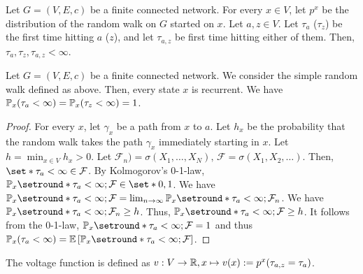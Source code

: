 \begin{lem}
  Let $G=(V,E,c)$ be a finite connected network. For every $x\in V$, let \(p^x\) be the distribution of the random walk on $G$ started on $x$. Let $a,z \in V$. Let $\tau_a$ ($\tau_z$) be the first time hitting $a$ ($z$), and let $\tau_{a,z}$ be first time hitting either of them. Then, $\tau_a,\tau_z,\tau_{a,z}< \infty$.
\end{lem}

\begin{fact}
  Let $G=(V,E,c)$ be a finite connected network. We consider the simple random walk defined as above. Then, every state $x$ is recurrent. We have $\mathbb{P}_x(\tau_a < \infty)= \mathbb{P}_x(\tau_z<\infty)=1$.
\end{fact}
\begin{proof}
For every $x$, let $\gamma_x$ be a path from $x$ to $a$. Let $h_x$ be the probability that the random walk takes the path $\gamma_x$ immediately starting in $x$. Let $h= \min_{x\in V}h_x>0$. Let $\mathcal{F}_n ) = \sigma(X_1, \dots, X_N), \, \mathcal{F}=\sigma(X_1, X_2, \dots)$. Then, $\set*{\tau_a < \infty } \in \FFF$. By Kolmogorov's 0-1-law, $\mathbb{P}_x \setround*{\tau_a<\infty ; \FFF} \in \set*{0,1 }$. We have \(\mathbb{P}_x \setround*{\tau_a < \infty  ; \mathcal{F}} = \lim_{n \to \infty} \mathbb{P}_x \setround*{\tau_a < \infty ; \mathcal{F}_n}\). We have \(\mathbb{P}_x \setround*{\tau_a < \infty ;\mathcal{F}_n} \geq h \). Thus, \(\mathbb{P}_x \setround*{\tau_a <\infty  ;\mathcal{F}}\geq h\). It follows from the 0-1-law, $\mathbb{P}_x \setround*{ \tau_a < \infty ;\mathcal{F}}=1$ and thus \(\mathbb{P}_x(\tau_a < \infty) = \mathbb{E} \left[\mathbb{P}_x \setround*{\tau_a <\infty; \mathcal{F}}\right]\). 
\end{proof}



\begin{defn}
  The voltage function is defined as $v: V \to \mathbb{R}, x \mapsto v(x):=p^x(\tau_{a,z}=\tau_a)$.
\end{defn}


